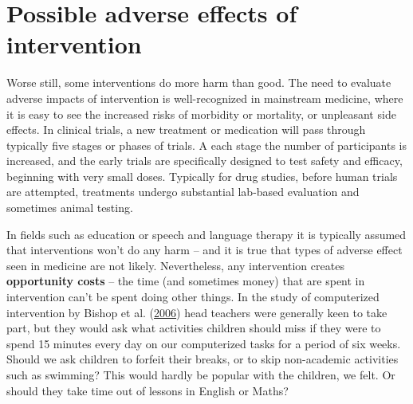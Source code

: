 \documentclass{krantz}
\begin{document}
\hypertarget{possible-adverse-effects-of-intervention}{%
\section{Possible adverse effects of intervention}\label{possible-adverse-effects-of-intervention}}

Worse still, some interventions do more harm than good. The need to evaluate adverse impacts of intervention is well-recognized in mainstream medicine, where it is easy to see the increased risks of morbidity or mortality, or unpleasant side effects. In clinical trials, a new treatment or medication will pass through typically five stages or phases of trials. A each stage the number of participants is increased, and the early trials are specifically designed to test safety and efficacy, beginning with very small doses. Typically for drug studies, before human trials are attempted, treatments undergo substantial lab-based evaluation and sometimes animal testing.

In fields such as education or speech and language therapy it is typically assumed that interventions won't do any harm -- and it is true that types of adverse effect seen in medicine are not likely. Nevertheless, any intervention creates \textbf{opportunity costs} -- the time (and sometimes money) that are spent in intervention can't be spent doing other things. In the study of computerized intervention by Bishop et al. (\protect\hyperlink{ref-bishop2006}{2006}) head teachers were generally keen to take part, but they would ask what activities children should miss if they were to spend 15 minutes every day on our computerized tasks for a period of six weeks. Should we ask children to forfeit their breaks, or to skip non-academic activities such as swimming? This would hardly be popular with the children, we felt. Or should they take time out of lessons in English or Maths?
\end{document}
